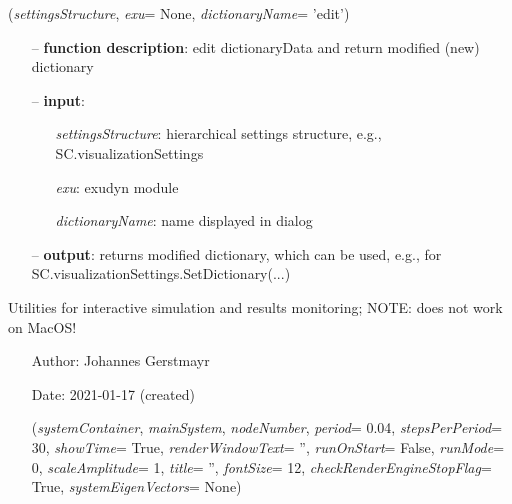 \begin{itemize}[leftmargin=1.4cm]
\begin{itemize}[leftmargin=1.4cm]
\begin{itemize}[leftmargin=1.4cm]
\begin{itemize}[leftmargin=0.5cm]
\begin{itemize}[leftmargin=1.4cm]
\begin{itemize}[leftmargin=1.4cm]
\begin{itemize}[leftmargin=0.5cm]
\begin{itemize}[leftmargin=1.4cm]
\begin{itemize}[leftmargin=0.5cm]
\begin{itemize}[leftmargin=1.4cm]
\begin{flushleft}
\label{sec:GUI:EditDictionaryWithTypeInfo}
({\it settingsStructure}, {\it exu}= None, {\it dictionaryName}= 'edit')
\end{flushleft}
\setlength{\itemindent}{0.7cm}
\begin{itemize}[leftmargin=0.7cm]
\item[--]
{\bf function description}: edit dictionaryData and return modified (new) dictionary
\item[--]
{\bf input}: \vspace{-6pt}
\begin{itemize}[leftmargin=1.2cm]
\setlength{\itemindent}{-0.7cm}
\item[]{\it settingsStructure}: hierarchical settings structure, e.g., SC.visualizationSettings
\item[]{\it exu}: exudyn module
\item[]{\it dictionaryName}: name displayed in dialog
\end{itemize}
\item[--]
{\bf output}: returns modified dictionary, which can be used, e.g., for SC.visualizationSettings.SetDictionary(...)
\vspace{12pt}\end{itemize}
%
\label{sec:module:interactive}
  Utilities for interactive simulation and results monitoring; NOTE: does not work on MacOS!
\begin{itemize}[leftmargin=1.4cm]
\setlength{\itemindent}{-1.4cm}
\item[]Author:    Johannes Gerstmayr
\item[]Date:      2021-01-17 (created)
\ei
\begin{flushleft}
\label{sec:interactive:AnimateModes}
({\it systemContainer}, {\it mainSystem}, {\it nodeNumber}, {\it period}= 0.04, {\it stepsPerPeriod}= 30, {\it showTime}= True, {\it renderWindowText}= '', {\it runOnStart}= False, {\it runMode}= 0, {\it scaleAmplitude}= 1, {\it title}= '', {\it fontSize}= 12, {\it checkRenderEngineStopFlag}= True, {\it systemEigenVectors}= None)
\end{flushleft}
\setlength{\itemindent}{0.7cm}
\begin{itemize}[leftmargin=0.7cm]

\end{itemize}
\end{itemize}
\end{itemize}
\end{itemize}
\end{itemize}
\end{itemize}
\end{itemize}
\end{itemize}
\end{itemize}
\end{itemize}
\end{itemize}
\end{itemize}
